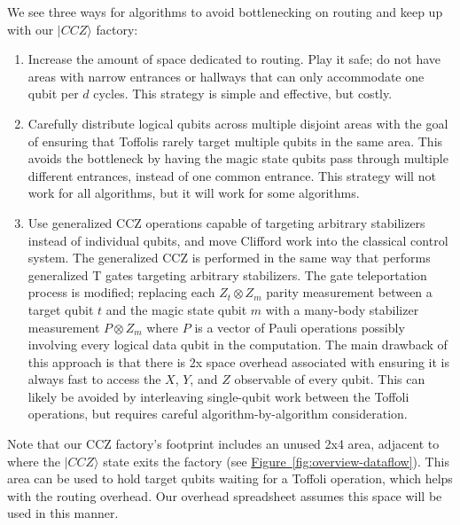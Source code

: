 \documentclass[twocolumn,accepted=2019-03-30]{quantumarticle}
\newcommand{\fig}[1]{\hyperref[fig:#1]{Figure~\ref*{fig:#1}}}
\begin{document}
We see three ways for algorithms to avoid bottlenecking on routing and keep up with our $|CCZ\rangle$ factory:

\begin{enumerate}
\item
    Increase the amount of space dedicated to routing.
    Play it safe; do not have areas with narrow entrances or hallways that can only accommodate one qubit per $d$ cycles.
    This strategy is simple and effective, but costly.
\item
    Carefully distribute logical qubits across multiple disjoint areas with the goal of ensuring that Toffolis rarely target multiple qubits in the same area.
    This avoids the bottleneck by having the magic state qubits pass through multiple different entrances, instead of one common entrance.
    This strategy will not work for all algorithms, but it will work for some algorithms.
\item
    Use generalized CCZ operations capable of targeting arbitrary stabilizers instead of individual qubits, and move Clifford work into the classical control system.
    The generalized CCZ is performed in the same way that \cite{litinski2018} performs generalized T gates targeting arbitrary stabilizers.
    The gate teleportation process is modified; replacing each $Z_t \otimes Z_m$ parity measurement between a target qubit $t$ and the magic state qubit $m$ with a many-body stabilizer measurement $P \otimes Z_m$ where $P$ is a vector of Pauli operations possibly involving every logical data qubit in the computation.
    The main drawback of this approach is that there is 2x space overhead associated with ensuring it is always fast to access the $X$, $Y$, and $Z$ observable of every qubit.
    This can likely be avoided by interleaving single-qubit work between the Toffoli operations, but requires careful algorithm-by-algorithm consideration.
\end{enumerate}

Note that our CCZ factory's footprint includes an unused 2x4 area, adjacent to where the $|CCZ\rangle$ state exits the factory (see \fig{overview-dataflow}).
This area can be used to hold target qubits waiting for a Toffoli operation, which helps with the routing overhead. Our overhead spreadsheet assumes this space will be used in this manner.
\end{document}
